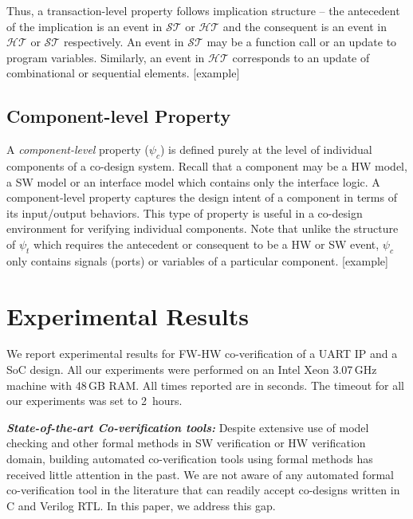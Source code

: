 \documentclass[sigconf]{acmart}
\newcommand{\rmcmt}[1]{{\color{magenta} [{#1}]}}
\begin{document}
Thus, a transaction-level property follows implication structure -- the 
antecedent of the implication is an event in $\mathcal{ST}$ or 
$\mathcal{HT}$ and the consequent is an event in $\mathcal{HT}$ 
or $\mathcal{ST}$ respectively.  An event in $\mathcal{ST}$ may be 
a function call or an update to program variables. Similarly, an event in 
$\mathcal{HT}$ corresponds to an update of combinational or sequential 
elements. \rmcmt{example} 

\subsection{Component-level Property}
A {\em component-level} property ($\psi_{c}$) is defined purely at the 
level of individual components of a co-design system. Recall that a component 
may be a HW model, a SW model or an interface model which contains only the 
interface logic.  A component-level property captures the design intent of a 
component in terms of its input/output behaviors.  This type of property 
is useful in a co-design environment for verifying individual components.   
Note that unlike the structure of $\psi_{t}$ which requires the antecedent 
or consequent to be a HW or SW event,  $\psi_{c}$ only contains signals 
(ports) or variables of a particular component. \rmcmt{example} 
 
\section{Experimental Results}
%
We report experimental results for FW-HW co-verification of a UART IP and a
SoC design.  All our experiments were performed on an Intel Xeon 3.07\,GHz
machine with 48\,GB RAM.  All times reported are in seconds.  The timeout 
for all our experiments was set to 2~hours.  
%

\textit{\textbf{State-of-the-art Co-verification tools:}} 
%
Despite extensive use of model checking and other formal methods in 
SW verification or HW verification domain, building automated 
co-verification tools using formal methods has received 
little attention in the past.  We are not aware of any automated 
formal co-verification tool in the literature that can readily accept 
co-designs written in C and Verilog RTL. In this paper, we address this gap. 
%
\end{document}
